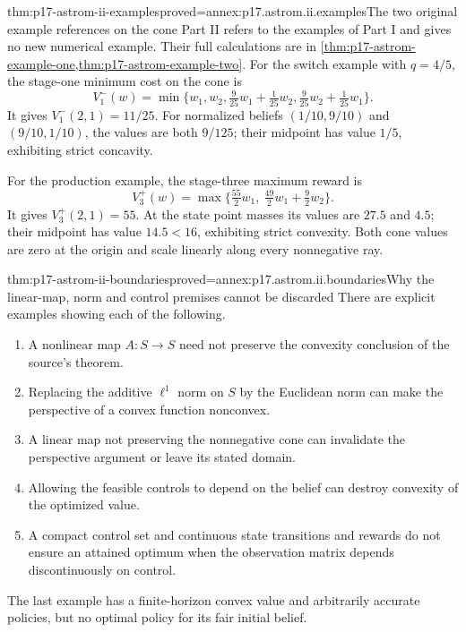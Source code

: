 \begin{hbtheorem}{thm:p17-astrom-ii-examples}{proved=annex:p17.astrom.ii.examples}{The two original example references on the cone}
Part II refers to the examples of Part I and gives no new
numerical example. Their full calculations are in
\cref{thm:p17-astrom-example-one,thm:p17-astrom-example-two}.
For the switch example with \(q=4/5\), the stage-one
minimum cost on the cone is
\[
 V_1^-(w)=
 \min\{w_1,w_2,\tfrac9{25}w_1+\tfrac1{25}w_2,
                       \tfrac9{25}w_2+\tfrac1{25}w_1\}.
\]
It gives \(V_1^-(2,1)=11/25\).
For normalized beliefs \((1/10,9/10)\) and
\((9/10,1/10)\), the values are both \(9/125\);
their midpoint has value \(1/5\), exhibiting strict concavity.

For the production example, the stage-three maximum reward is
\[
                 V_3^+(w)=
                  \max\{\tfrac{55}{2}w_1,\
                                  \tfrac{49}{2}w_1+\tfrac92w_2\}.
\]
It gives \(V_3^+(2,1)=55\).
At the state point masses its values are \(27.5\) and \(4.5\);
their midpoint has value \(14.5<16\), exhibiting strict convexity.
Both cone values are zero at the origin and scale linearly
along every nonnegative ray.
\end{hbtheorem}

\begin{hbtheorem}{thm:p17-astrom-ii-boundaries}{proved=annex:p17.astrom.ii.boundaries}{Why the linear-map, norm and control premises cannot be discarded}
There are explicit examples showing each of the following.
\begin{enumerate}
\item A nonlinear map \(A:S\to S\) need not preserve the
      convexity conclusion of the source's theorem.
\item Replacing the additive \(\ell^1\) norm on \(S\) by
      the Euclidean norm can make the perspective of a
      convex function nonconvex.
\item A linear map not preserving the nonnegative cone
      can invalidate the perspective argument or leave
      its stated domain.
\item Allowing the feasible controls to depend on the
      belief can destroy convexity of the optimized value.
\item A compact control set and continuous state transitions
      and rewards do not ensure an attained optimum when
      the observation matrix depends discontinuously on control.
\end{enumerate}
The last example has a finite-horizon convex value and
arbitrarily accurate policies, but no optimal policy for
its fair initial belief.
\end{hbtheorem}

